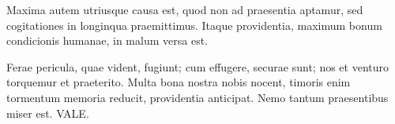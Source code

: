 {Maxima autem utriusque causa est, quod non ad praesentia aptamur, sed cogitationes in longinqua praemittimus. Itaque providentia, maximum bonum condicionis humanae, in malum versa est.

Ferae pericula, quae vident, fugiunt; cum effugere, securae sunt; nos et venturo torquemur et praeterito. Multa bona nostra nobis nocent, timoris enim tormentum memoria reducit, providentia anticipat. Nemo tantum praesentibus miser est. VALE.

}




